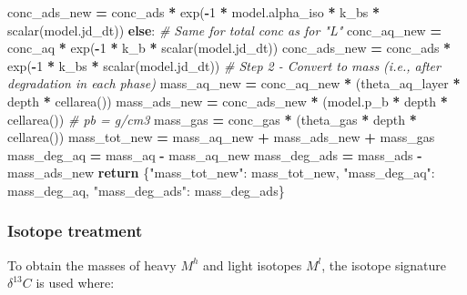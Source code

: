 \documentclass[]{article}
\newenvironment{Shaded}{\begin{snugshade}}{\end{snugshade}}
\newcommand{\DecValTok}[1]{\textcolor[rgb]{0.00,0.00,0.81}{#1}}
\newcommand{\StringTok}[1]{\textcolor[rgb]{0.31,0.60,0.02}{#1}}
\newcommand{\CommentTok}[1]{\textcolor[rgb]{0.56,0.35,0.01}{\textit{#1}}}
\newcommand{\ControlFlowTok}[1]{\textcolor[rgb]{0.13,0.29,0.53}{\textbf{#1}}}
\newcommand{\OperatorTok}[1]{\textcolor[rgb]{0.81,0.36,0.00}{\textbf{#1}}}
\newcommand{\NormalTok}[1]{#1}
\begin{document}
\begin{Shaded}
\begin{Highlighting}[]
\NormalTok{        conc_ads_new }\OperatorTok{=}\NormalTok{ conc_ads }\OperatorTok{*}\NormalTok{ exp(}\OperatorTok{-}\DecValTok{1} \OperatorTok{*}\NormalTok{ model.alpha_iso }\OperatorTok{*}\NormalTok{ k_bs }\OperatorTok{*}\NormalTok{ scalar(model.jd_dt))}
    \ControlFlowTok{else}\NormalTok{:  }\CommentTok{# Same for total conc as for "L"}
\NormalTok{        conc_aq_new }\OperatorTok{=}\NormalTok{ conc_aq }\OperatorTok{*}\NormalTok{ exp(}\OperatorTok{-}\DecValTok{1} \OperatorTok{*}\NormalTok{ k_b }\OperatorTok{*}\NormalTok{ scalar(model.jd_dt))}
\NormalTok{        conc_ads_new }\OperatorTok{=}\NormalTok{ conc_ads }\OperatorTok{*}\NormalTok{ exp(}\OperatorTok{-}\DecValTok{1} \OperatorTok{*}\NormalTok{ k_bs }\OperatorTok{*}\NormalTok{ scalar(model.jd_dt))}
    \CommentTok{# Step 2 - Convert to mass (i.e., after degradation in each phase)}
\NormalTok{    mass_aq_new }\OperatorTok{=}\NormalTok{ conc_aq_new }\OperatorTok{*}\NormalTok{ (theta_aq_layer }\OperatorTok{*}\NormalTok{ depth }\OperatorTok{*}\NormalTok{ cellarea())}
\NormalTok{    mass_ads_new }\OperatorTok{=}\NormalTok{ conc_ads_new }\OperatorTok{*}\NormalTok{ (model.p_b }\OperatorTok{*}\NormalTok{ depth }\OperatorTok{*}\NormalTok{ cellarea())  }\CommentTok{# pb = g/cm3}
\NormalTok{    mass_gas }\OperatorTok{=}\NormalTok{ conc_gas }\OperatorTok{*}\NormalTok{ (theta_gas }\OperatorTok{*}\NormalTok{ depth }\OperatorTok{*}\NormalTok{ cellarea())}
\NormalTok{    mass_tot_new }\OperatorTok{=}\NormalTok{ mass_aq_new }\OperatorTok{+}\NormalTok{ mass_ads_new }\OperatorTok{+}\NormalTok{ mass_gas}
\NormalTok{    mass_deg_aq }\OperatorTok{=}\NormalTok{ mass_aq }\OperatorTok{-}\NormalTok{ mass_aq_new}
\NormalTok{    mass_deg_ads }\OperatorTok{=}\NormalTok{ mass_ads }\OperatorTok{-}\NormalTok{ mass_ads_new}
    \ControlFlowTok{return}\NormalTok{ \{}\StringTok{"mass_tot_new"}\NormalTok{: mass_tot_new,}
            \StringTok{"mass_deg_aq"}\NormalTok{: mass_deg_aq,}
            \StringTok{"mass_deg_ads"}\NormalTok{: mass_deg_ads\}}
\end{Highlighting}
\end{Shaded}

\hypertarget{isotope-treatment}{%
\subsubsection{Isotope treatment}\label{isotope-treatment}}

To obtain the masses of heavy \(M^h\) and light isotopes \(M^l\), the
isotope signature \(\delta ^{13}C\) is used where:
\end{document}
